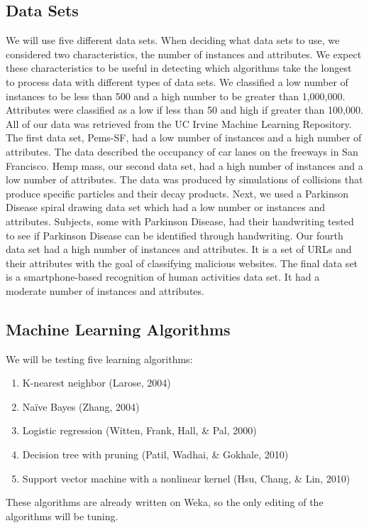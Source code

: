 \documentclass[11pt]{article} %
\begin{document}
\subsection{Data Sets}
We will use five different data sets.  When deciding what data sets to use, we considered two characteristics, the number of instances and attributes.  We expect these characteristics to be useful in detecting which algorithms take the longest to process data with different types of data sets.  We classified a low number of instances to be less than 500 and a high number to be greater than 1,000,000.  Attributes were classified as a low if less than 50 and high if greater than 100,000.  All of our data was retrieved from the UC Irvine Machine Learning Repository.  The first data set, Pems-SF, had a low number of instances and a high number of attributes.  The data described the occupancy of car lanes on the freeways in San Francisco.  Hemp mass, our second data set, had a high number of instances and a low number of attributes.  The data was produced by simulations of collisions that produce specific particles and their decay products. Next, we used a Parkinson Disease spiral drawing data set which had a low number or instances and attributes.  Subjects, some with Parkinson Disease, had their handwriting tested to see if Parkinson Disease can be identified through handwriting.  Our fourth data set had a high number of instances and attributes.  It is a set of URLs and their attributes with the goal of classifying malicious websites.  The final data set is a smartphone-based recognition of human activities data set.  It had a moderate number of instances and attributes.

\subsection{Machine Learning Algorithms}
We will be testing five learning algorithms:
\begin{enumerate}
	\item K-nearest neighbor (Larose, 2004)
	\item Na\"{i}ve Bayes (Zhang, 2004)
	\item Logistic regression (Witten, Frank, Hall, \& Pal, 2000)
	\item Decision tree with pruning (Patil, Wadhai, \& Gokhale, 2010)
	\item Support vector machine with a nonlinear kernel (Hsu, Chang, \& Lin, 2010)
\end{enumerate}
These algorithms are already written on Weka, so the only editing of the algorithms will be tuning.
\end{document}
